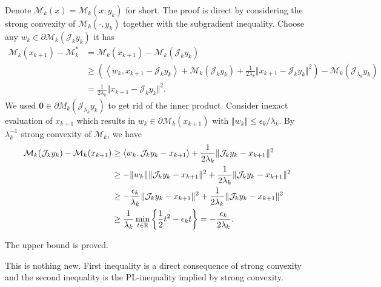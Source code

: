 \documentclass[12pt]{article}
\begin{document}
        Denote $\mathcal M_k(x) = \mathcal M_k(x; y_k)$ for short. 
        The proof is direct by considering the strong convexity of $\mathcal M_k(\cdot, y_k)$ together with the subgradient inequality. 
        Choose any $w_k \in \partial \mathcal M_k(\mathcal J_{k} y_k)$ it has
        \begin{align*}
            \mathcal M_k(x_{k + 1}) - \mathcal M^*_k
            &= 
            \mathcal M_k(x_{k + 1}) - \mathcal M_k(\mathcal J_{k} y_k)
            \\
            &\ge 
            \left(
                \left\langle 
                    w_k, 
                    x_{k + 1} - \mathcal J_{k} y_k 
                \right\rangle
                + 
                \mathcal M_k(\mathcal J_{k}y_k)
                + \frac{1}{2\lambda_k}\Vert x_{k + 1} - \mathcal J_{k}y_k\Vert^2
            \right)
            - 
            \mathcal M_k(\mathcal J_{\lambda_k}y_k) 
            \\
            &= \frac{1}{2\lambda_k}\Vert x_{k +1} - \mathcal J_{k}y_k\Vert^2. 
        \end{align*}
        We used $\mathbf 0 \in \partial M_k(\mathcal J_{\lambda_k}y_k)$ to get rid of the inner product. 
        Consider inexact evaluation of $x_{k + 1}$ which results in $w_k \in \partial \mathcal M_k(x_{k + 1})$ with $\Vert w_k\Vert \le \epsilon_k/\lambda_k$. 
        By $\lambda_k^{-1}$ strong convexity of $\mathcal M_k$, we have 
        \begin{align*}
            \mathcal M_k(\mathcal J_{k}y_k) - \mathcal M_k(x_{k + 1})
            &\ge 
            \langle w_k, \mathcal J_{k}y_k - x_{k + 1}\rangle
            + \frac{1}{2\lambda_k}\Vert \mathcal J_{k} y_k - x_{k + 1}\Vert^2
            \\
            &\ge 
            - \Vert w_k\Vert\Vert \mathcal J_{k}y_k - x_{k + 1}\Vert^2
            + \frac{1}{2\lambda_k}\Vert \mathcal J_{k} y_k - x_{k + 1}\Vert^2
            \\
            &\ge 
            - \frac{\epsilon_k}{\lambda_k}\Vert \mathcal J_{k}y_k - x_{k + 1}\Vert^2
            + \frac{1}{2\lambda_k}\Vert \mathcal J_{k} y_k - x_{k + 1}\Vert^2
            \\
            &\ge \frac{1}{\lambda_k}
            \min_{t \in \mathbb R} \left\lbrace
                \frac{1}{2}t^2 - \epsilon_k t
            \right\rbrace = - \frac{\epsilon_k}{2\lambda_k}. 
        \end{align*}

        The upper bound is proved. 
        \begin{remark}
            This is nothing new. 
            First inequality is a direct consequence of strong convexity and the second inequality is the PL-inequality implied by strong convexity. 
        \end{remark}
\end{document}
